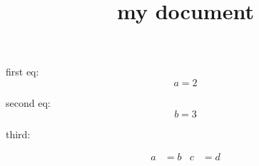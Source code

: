 \documentclass{article}
\title{my document}
\begin{document}

first eq:
\[
  a = 2
\]

second eq:
\[b=3\]

third:

\begin{align*}
  a&=b&c&=d
\end{align*}


\end{document}
